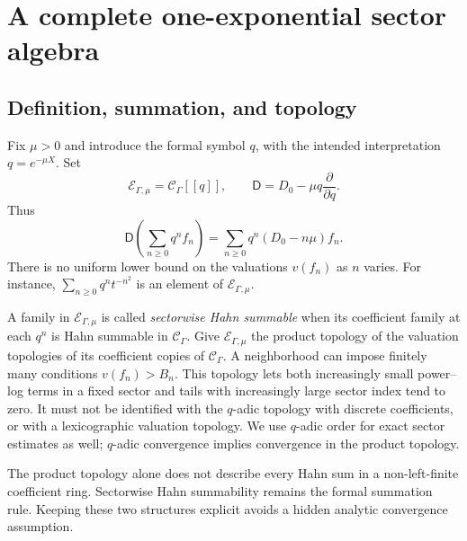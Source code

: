 \documentclass[11pt,a4paper]{article}
\theoremstyle{definition}
\theoremstyle{remark}
\newcommand{\C}{\mathcal C_\Gamma}
\newcommand{\E}{\mathcal E_{\Gamma,\mu}}
\newcommand{\D}{\mathsf D}
\begin{document}
\section{A complete one-exponential sector algebra}
\label{sec:sector}

\subsection{Definition, summation, and topology}
Fix $\mu>0$ and introduce the formal symbol $q$, with the intended
interpretation $q=e^{-\mu X}$. Set
\begin{equation}\label{eq:sectorRing}
 \E=\C[[q]],\qquad
 \D=D_0-\mu q\frac{\partial}{\partial q}.
\end{equation}
Thus
\begin{equation}\label{eq:sectorD}
 \D\left(\sum_{n\ge0}q^nf_n\right)
 =\sum_{n\ge0}q^n(D_0-n\mu)f_n.
\end{equation}
There is no uniform lower bound on the valuations $v(f_n)$ as $n$ varies.
For instance, $\sum_{n\ge0}q^nt^{-n^2}$ is an element of $\E$.

A family in $\E$ is called \emph{sectorwise Hahn summable} when its
coefficient family at each $q^n$ is Hahn summable in $\C$. Give $\E$ the
product topology of the valuation topologies of its coefficient copies of
$\C$. A neighborhood can impose finitely many conditions
$v(f_n)>B_n$. This topology lets both increasingly small power--log terms
in a fixed sector and tails with increasingly large sector index tend to
zero. It must not be identified with the $q$-adic topology with discrete
coefficients, or with a lexicographic valuation topology. We use $q$-adic
order for exact sector estimates as well; $q$-adic convergence implies
convergence in the product topology.

The product topology alone does not describe every Hahn sum in a
non-left-finite coefficient ring. Sectorwise Hahn summability remains the
formal summation rule. Keeping these two structures explicit avoids a
hidden analytic convergence assumption.
\end{document}
